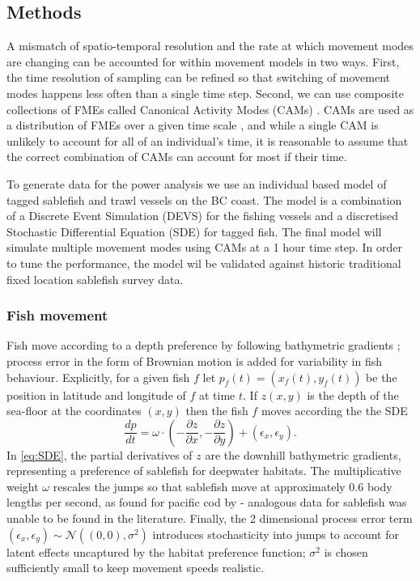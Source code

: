 \documentclass{article}
\begin{document}
\subsection{Methods}

A mismatch of spatio-temporal resolution and the rate at which movement modes are changing can be accounted for within movement models in two ways. First, the time resolution of sampling can be refined so that switching of movement modes happens less often than a single time step. Second, we can use composite collections of FMEs called Canonical Activity Modes (CAMs) \citep{fryxell2008multiple}. CAMs are used as a distribution of FMEs over a given time scale , and while a single CAM is unlikely to account for all of an individual's time, it is reasonable to assume that the correct combination of CAMs can account for most if their time.

To generate data for the power analysis we use an individual based model of tagged sablefish and trawl vessels on the BC coast. The model is a combination of a Discrete Event Simulation (DEVS) for the fishing vessels and a discretised Stochastic Differential Equation (SDE) for tagged fish. The final model will simulate multiple movement modes using CAMs at a 1 hour time step. In order to tune the performance, the model wil be validated against historic traditional fixed location sablefish survey data.

\subsubsection*{Fish movement}

Fish move according to a depth preference by following bathymetric gradients \citep{preisler2001stochastic,brillinger2003simulating}; process error in the form of Brownian motion is added for variability in fish behaviour. Explicitly, for a given fish $f$ let $p_f(t) = (x_f(t), y_f(t))$ be the position in latitude and longitude of $f$ at time $t$. If $z(x,y)$ is the depth of the sea-floor at the coordinates $(x,y)$ then the fish $f$ moves according the the SDE
\begin{equation}\label{eq:SDE}
\frac{dp}{dt} = \omega \cdot \left( - \frac{\partial z}{\partial x}, - \frac{\partial z}{\partial y} \right) + (\epsilon_x, \epsilon_y). 
\end{equation}
In \eqref{eq:SDE}, the partial derivatives of $z$ are the downhill bathymetric gradients, representing a preference of sablefish for deepwater habitats. The multiplicative weight $\omega$ rescales the jumps so that sablefish move at approximately 0.6 body lengths per second, as found for pacific cod by \citet{hanna2008temperature} - analogous data for sablefish was unable to be found in the literature. Finally, the 2 dimensional process error term $(\epsilon_x, \epsilon_y) \sim \mathcal{N}((0,0), \sigma^2)$ introduces stochasticity into jumps to account for latent effects uncaptured by the habitat preference function; $\sigma^2$ is chosen sufficiently small to keep movement speeds realistic.
\end{document}
